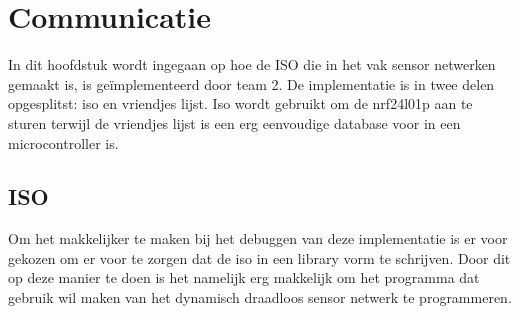\section{Communicatie} \label{sec:communication}
In dit hoofdstuk wordt ingegaan op hoe de ISO die in het vak sensor netwerken gemaakt is, is geïmplementeerd door team 2. De implementatie is in twee delen opgesplitst: iso en vriendjes lijst. Iso wordt gebruikt om de nrf24l01p aan te sturen terwijl de vriendjes lijst is een erg eenvoudige database voor in een microcontroller is.
\subsection{ISO}
    Om het makkelijker te maken bij het debuggen van deze implementatie is er voor gekozen om er voor te zorgen dat de iso in een library vorm te schrijven. Door dit op deze manier te doen is het namelijk erg makkelijk om het programma dat gebruik wil maken van het dynamisch draadloos sensor netwerk te programmeren.

